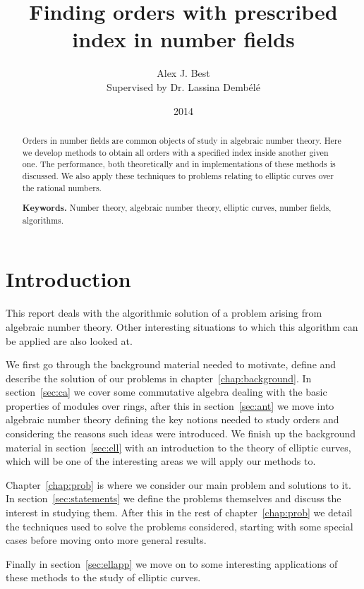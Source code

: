 \documentclass[12pt,a4paper,abstracton,bibtotoc]{scrreprt}
\author{Alex J. Best \\ Supervised by Dr. Lassina Demb\'el\'e}
\date{2014}
\title{Finding orders with prescribed index in number fields}
\theoremstyle{definition}
\begin{document}
\maketitle

\begin{abstract}
Orders in number fields are common objects of study in algebraic number theory.
Here we develop methods to obtain all orders with a specified index inside another given one.
The performance, both theoretically and in implementations of these methods is discussed.
We also apply these techniques to problems relating to elliptic curves over the rational numbers.

\smallskip
\noindent \textbf{Keywords.} Number theory, algebraic number theory, elliptic curves, number fields, algorithms.
\end{abstract}

\tableofcontents

\chapter{Introduction}
This report deals with the algorithmic solution of a problem arising from algebraic number theory. 
Other interesting situations to which this algorithm can be applied are also looked at.

We first go through the background material needed to motivate, define and describe the solution of our problems in chapter~\ref{chap:background}.
In section~\ref{sec:ca} we cover some commutative algebra dealing with the basic properties of modules over rings, after this in section~\ref{sec:ant} we move into algebraic number theory defining the key notions needed to study orders and considering the reasons such ideas were introduced.
We finish up the background material in section~\ref{sec:ell} with an introduction to the theory of elliptic curves, which will be one of the interesting areas we will apply our methods to.

Chapter~\ref{chap:prob} is where we consider our main problem and solutions to it.
In section~\ref{sec:statements} we define the problems themselves and discuss the interest in studying them.
After this in the rest of chapter~\ref{chap:prob} we detail the techniques used to solve the problems considered, starting with some special cases before moving onto more general results.

Finally in section~\ref{sec:ellapp} we move on to some interesting applications of these methods to the study of elliptic curves.
\end{document}
